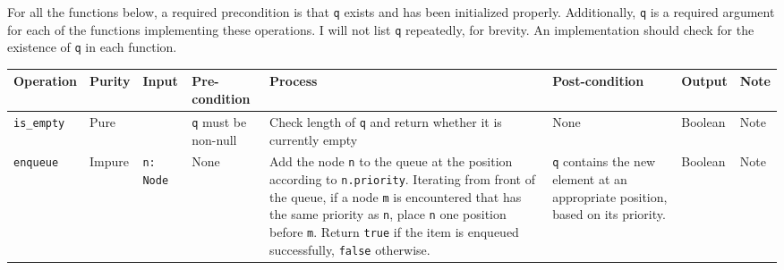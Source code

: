 \documentclass[10pt,letterpaper,final]{report}
\begin{document}
For all the functions below, a required precondition is that \verb|q| exists and has been initialized properly. Additionally, \verb|q| is a required argument for each of the functions implementing these operations. I will not list \verb|q| repeatedly, for brevity. An implementation should check for the existence of \verb|q| in each function.

  {\small
    \medskip
    \begin{center}
      \begin{landscape}
        \begin{xltabular}{\linewidth}{|l|l|X|X|X|X|X|X|}
          \hline
          Operation        & Purity & Input                             & Pre-condition                                                 & Process                                                                                                                                                                                                                                                                                                                       & Post-condition                                                                                                                                               & Output   & Note                                                                                                                                                            \\ \hline
          \endhead
          \verb|is_empty|  & Pure   &                                   & \verb|q| must be non-null                                     & Check length of \verb|q| and return whether it is currently empty                                                                                                                                                                                                                                                             & None                                                                                                                                                         & Boolean  & Note                                                                                                                                                            \\ \hline
          \verb|enqueue|   & Impure & \verb|n: Node|                    & None                                                          & Add the node \verb|n| to the queue at the position according to \verb|n.priority|. Iterating from front of the queue, if a node \verb|m| is encountered that has the same priority as \verb|n|, place \verb|n| one position before \verb|m|. Return \verb|true| if the item is enqueued successfully, \verb|false| otherwise. & \verb|q| contains the new element at an appropriate position, based on its priority.                                                                         & Boolean  & Note                                                                                                                                                            \\ \hline

\end{xltabular}
\end{landscape}
\end{center}}
\end{document}
